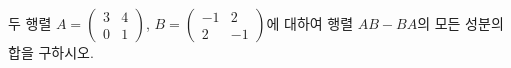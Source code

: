 두 행렬 $A=\begin{pmatrix} 3 & 4 \\ 0 & 1 \end{pmatrix}$, $B=\begin{pmatrix} -1 & 2 \\ 2 & -1 \end{pmatrix}$에 대하여 행렬 $AB-BA$의 모든 성분의 합을 구하시오.
